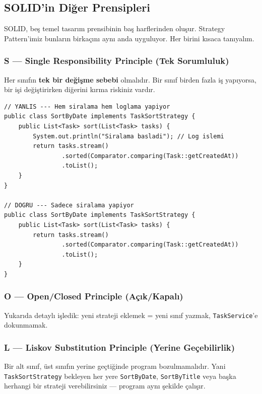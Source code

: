\documentclass[11pt,a4paper]{article}
\begin{document}
\subsection*{SOLID'in Di\u{g}er Prensipleri}

SOLID, be\c{s} temel tasar{\i}m prensibinin ba\c{s} harflerinden olu\c{s}ur. Strategy Pattern'imiz bunlar{\i}n birka\c{c}{\i}n{\i} ayn{\i} anda uyguluyor. Her birini k{\i}saca tan{\i}yal{\i}m.

\subsubsection*{S --- Single Responsibility Principle (Tek Sorumluluk)}

Her s{\i}n{\i}f{\i}n \textbf{tek bir de\u{g}i\c{s}me sebebi} olmal{\i}d{\i}r. Bir s{\i}n{\i}f birden fazla i\c{s} yap{\i}yorsa, bir i\c{s}i de\u{g}i\c{s}tirirken di\u{g}erini k{\i}rma riskiniz vard{\i}r.

\begin{lstlisting}[style=java]
// YANLIS --- Hem siralama hem loglama yapiyor
public class SortByDate implements TaskSortStrategy {
    public List<Task> sort(List<Task> tasks) {
        System.out.println("Siralama basladi"); // Log islemi
        return tasks.stream()
                .sorted(Comparator.comparing(Task::getCreatedAt))
                .toList();
    }
}

// DOGRU --- Sadece siralama yapiyor
public class SortByDate implements TaskSortStrategy {
    public List<Task> sort(List<Task> tasks) {
        return tasks.stream()
                .sorted(Comparator.comparing(Task::getCreatedAt))
                .toList();
    }
}
\end{lstlisting}

\subsubsection*{O --- Open/Closed Principle (A\c{c}{\i}k/Kapal{\i})}

Yukar{\i}da detayl{\i} i\c{s}ledik: yeni strateji eklemek = yeni s{\i}n{\i}f yazmak, \texttt{TaskService}'e dokunmamak.

\subsubsection*{L --- Liskov Substitution Principle (Yerine Ge\c{c}ebilirlik)}

Bir alt s{\i}n{\i}f, \"{u}st s{\i}n{\i}f{\i}n yerine ge\c{c}ti\u{g}inde program bozulmamal{\i}d{\i}r. Yani \texttt{TaskSortStrategy} bekleyen her yere \texttt{SortByDate}, \texttt{SortByTitle} veya ba\c{s}ka herhangi bir strateji verebilirsiniz --- program ayn{\i} \c{s}ekilde \c{c}al{\i}\c{s}{\i}r.
\end{document}
